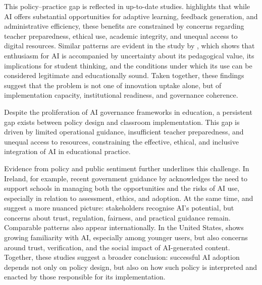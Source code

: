 This policy--practice gap is reflected in up-to-date studies.
\cite{ng2025opportunities} highlights that while AI offers substantial opportunities
for adaptive learning, feedback generation, and administrative efficiency, these
benefits are constrained by concerns regarding teacher preparedness, ethical use,
academic integrity, and unequal access to digital resources. Similar patterns are
evident in the study by \cite{bagdonaite2025artificial}, which shows that
enthusiasm for AI is accompanied by uncertainty about its pedagogical value,
its implications for student thinking, and the conditions under which its use can be
considered legitimate and educationally sound. Taken together, these findings suggest
that the problem is not one of innovation uptake alone, but of implementation
capacity, institutional readiness, and governance coherence.


\begin{center}
  \begin{tcolorbox}[ 
    width=\linewidth, 
    colback=gray!3, 
    colframe=black,
    boxrule=0.6pt, 
    title=Research Problem, 
    colbacktitle=gray!20, 
    coltitle=black,
    fonttitle=\bfseries] 
    Despite the proliferation of AI governance frameworks in education, a persistent
    gap exists between policy design and classroom implementation. This gap is driven
    by limited operational guidance, insufficient teacher preparedness, and unequal
    access to resources, constraining the effective, ethical, and inclusive
    integration of AI in educational practice.
  \end{tcolorbox}
\end{center}

Evidence from policy and public sentiment further underlines this challenge. In
Ireland, for example, recent government guidance by \cite{govie2025ainschools}
acknowledges the need to support schools in managing both the opportunities and the
risks of AI use, especially in relation to assessment, ethics, and adoption. At the
same time, \cite{qqi2025genai} and \cite{ucd2023aiperceptions} suggest a more
nuanced picture: stakeholders recognise AI's potential, but concerns about trust,
regulation, fairness, and practical guidance remain. Comparable patterns also appear
internationally. In the United States, \cite{pew2026aiteens} shows growing
familiarity with AI, especially among younger users, but also concerns around trust,
verification, and the social impact of AI-generated content. Together, these studies
suggest a broader conclusion: successful AI adoption depends not only on policy
design, but also on how such policy is interpreted and enacted by those responsible
for its implementation.


